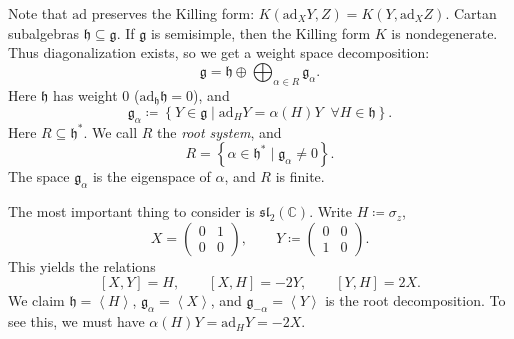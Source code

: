
Note that $\mathrm{ad} $ preserves the Killing form: $K(\mathrm{ad} _XY,Z)=K(Y,\mathrm{ad} _XZ)$. Cartan subalgebras $\mathfrak{h} \subseteq \mathfrak{g} $. If $\mathfrak{g} $ is semisimple, then the Killing form $K$ is nondegenerate. Thus diagonalization exists, so we get a weight space decomposition:
\[
	\mathfrak{g} = \mathfrak{h} \oplus \bigoplus_{\alpha \in R} \mathfrak{g} _\alpha 
.\]
Here $\mathfrak{h} $ has weight 0 ($\mathrm{ad} _{\mathfrak{h} } \mathfrak{h} =0$), and
\[
	\mathfrak{g} _\alpha \coloneqq \left\{ Y\in \mathfrak{g} \mid \mathrm{ad}_HY=\alpha (H)Y\;\;\forall H\in \mathfrak{h}  \right\} 
.\]
Here $R\subseteq \mathfrak{h} ^*$. We call $R$ the \emph{root system}, and
\[
	R=\left\{ \alpha \in \mathfrak{h} ^* \mid \mathfrak{g} _\alpha \neq 0 \right\} 
.\]
The space $\mathfrak{g} _\alpha $ is the eigenspace of $\alpha $, and $R$ is finite.

The most important thing to consider is $\mathfrak{sl} _2(\mathbb{C} )$. Write $H\coloneqq \sigma _z$,
\[
	X = \begin{pmatrix}
	0 & 1 \\
	0 & 0
	\end{pmatrix},\qquad Y \coloneqq \begin{pmatrix}
	0 & 0 \\
	1 & 0
	\end{pmatrix}
.\]
This yields the relations
\[
	[X,Y]=H,\qquad  [X,H]=-2Y,\qquad [Y,H] = 2X
.\]
We claim $\mathfrak{h} =\left\langle H \right\rangle $, $\mathfrak{g} _\alpha =\left\langle X \right\rangle $, and $\mathfrak{g} _{-\alpha } =\left\langle Y \right\rangle $ is the root decomposition. To see this, we must have $\alpha (H)Y=\mathrm{ad}_HY=-2X$.
